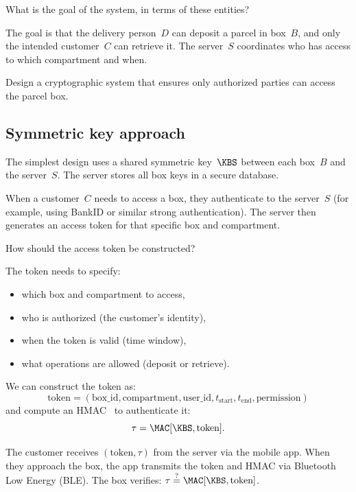 \begin{exercise}
  What is the goal of the system, in terms of these entities?
\end{exercise}

The goal is that the delivery person~\(D\) can deposit a parcel in box~\(B\),
and only the intended customer~\(C\) can retrieve it.
The server~\(S\) coordinates who has access to which compartment and when.

\begin{exercise}
  Design a cryptographic system that ensures only authorized parties can
  access the parcel box.
\end{exercise}

\subsection{Symmetric key approach}

The simplest design uses a shared symmetric key~\(\KBS\) between each
box~\(B\) and the server~\(S\).
The server stores all box keys in a secure database.

When a customer~\(C\) needs to access a box, they authenticate to the
server~\(S\) (for example, using BankID or similar strong authentication).
The server then generates an access token for that specific box and
compartment.

\begin{exercise}
  How should the access token be constructed?
\end{exercise}

The token needs to specify:
\begin{itemize}
  \item which box and compartment to access,
  \item who is authorized (the customer's identity),
  \item when the token is valid (time window),
  \item what operations are allowed (deposit or retrieve).
\end{itemize}

We can construct the token as:
\[
  \text{token} = (\text{box\_id}, \text{compartment}, \text{user\_id},
  t_{\text{start}}, t_{\text{end}}, \text{permission})
\]
and compute an HMAC~\autocite{HMAC} to authenticate it:
\[
  \tau = \MAC[\KBS, \text{token}].
\]

The customer receives \((\text{token}, \tau)\) from the server via the
mobile app.
When they approach the box, the app transmits the token and HMAC via
Bluetooth Low Energy (BLE).
The box verifies: \(\tau \stackrel{?}{=} \MAC[\KBS, \text{token}]\).

